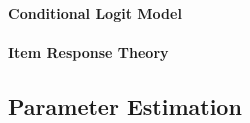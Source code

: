\paragraph{Conditional Logit Model}

\paragraph{Item Response Theory}

\subsection{Parameter Estimation}
